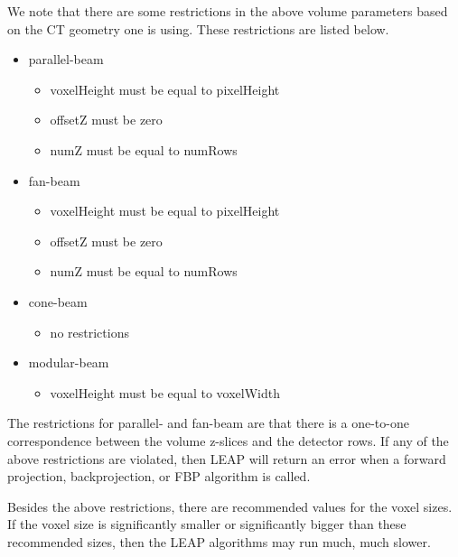 \documentclass[11pt]{article}
\begin{document}
We note that there are some restrictions in the above volume parameters based on the CT geometry one is using.  These restrictions are listed below.
\begin{itemize}
\item parallel-beam
    \begin{itemize}
    \item voxelHeight must be equal to pixelHeight
    \item offsetZ must be zero
    \item numZ must be equal to numRows
    \end{itemize}
\item fan-beam
    \begin{itemize}
    \item voxelHeight must be equal to pixelHeight
    \item offsetZ must be zero
    \item numZ must be equal to numRows
    \end{itemize}
\item cone-beam
    \begin{itemize}
    \item no restrictions
    \end{itemize}
\item modular-beam
    \begin{itemize}
    \item voxelHeight must be equal to voxelWidth
    \end{itemize}
\end{itemize}
The restrictions for parallel- and fan-beam are that there is a one-to-one correspondence between the volume z-slices and the detector rows.  If any of the above restrictions are violated, then LEAP will return an error when a forward projection, backprojection, or FBP algorithm is called.

Besides the above restrictions, there are recommended values for the voxel sizes.  If the voxel size is significantly smaller or significantly bigger than these recommended sizes, then the LEAP algorithms may run much, much slower.
\end{document}
